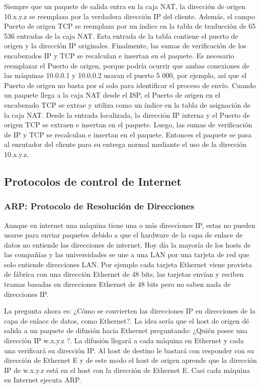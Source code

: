 \par Siempre que un paquete de salida entra en la caja NAT, la dirección de origen 10.x.y.z se reemplaza por la verdadera dirección IP del cliente. Además, el campo Puerto de origen TCP se reemplaza por un índice en la tabla de traducción de 65 536 entradas de la caja NAT. Esta entrada de la tabla contiene el puerto de
origen y la dirección IP originales. Finalmente, las sumas de verificación de los encabezados IP y TCP se recalculan e insertan en el paquete. Es necesario reemplazar el Puerto de origen, porque podría ocurrir que ambas conexiones de las máquinas 10.0.0.1 y 10.0.0.2 usaran el puerto 5 000, por ejemplo, así que el
Puerto de origen no basta por sí solo para identificar el proceso de envío. Cuando un paquete llega a la caja NAT desde el ISP, el Puerto de origen en el encabezado TCP se
extrae y utiliza como un índice en la tabla de asignación de la caja NAT. Desde la entrada localizada, la dirección IP interna y el Puerto de origen TCP se extraen e insertan en el paquete. Luego, las sumas de verificación de IP y TCP se recalculan e insertan en el paquete. Entonces el paquete se pasa al enrutador
del cliente para su entrega normal mediante el uso de la dirección 10.x.y.z.

\subsection{Protocolos de control de Internet}

\subsubsection{ARP: Protocolo de Resolución de Direcciones}

	\par Aunque en internet una máquina tiene una o más direcciones IP, estas no pueden usarse para enviar paquetes debido a que el hardware de la capa de enlace de datos no entiende las direcciones de internet. Hoy día la mayoría de los hosts de las compañías y las universidades se une a una LAN por una tarjeta de red que solo entiende direcciones LAN. Por ejemplo cada tarjeta Ethernet viene provista de fábrica con una dirección Ethernet de 48 bits, las tarjetas envían y reciben tramas basadas en direcciones Ethernet de 48 bits pero no saben nada de direcciones IP.
	
	\par La pregunta ahora es: ¿Cómo se convierten las direcciones IP en direcciones de la capa de enlace de datos, como Ethernet?. La idea sería que el host de origen dé salida a un paquete de difusión hacia Ethernet preguntando: ¿Quién posee una dirección IP w.x.y.z ?. La difusión llegará a cada máquina en Ethernet y cada una verificará su dirección IP. Al host de destino le bastará con responder con su dirección de Ethernet E y de este modo el host de origen aprende que la dirección IP de w.x.y.z está en el host con la dirección de Ethernet E. Casi cada máquina en Internet ejecuta ARP.

